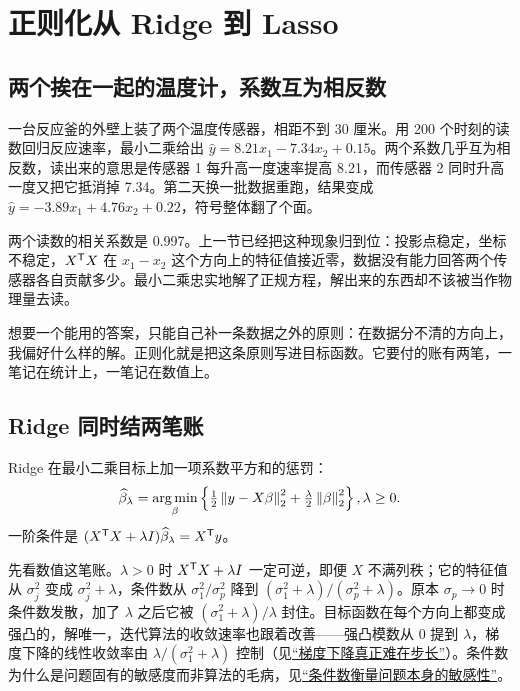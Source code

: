 \section{正则化从 Ridge 到 Lasso}
\label{sec:13-Machine-Learning/02-Linear-Models/02}

\subsection{两个挨在一起的温度计，系数互为相反数}

一台反应釜的外壁上装了两个温度传感器，相距不到 30 厘米。用 200 个时刻的读数回归反应速率，最小二乘给出 \(\widehat y=8.21x_1-7.34x_2+0.15\)。两个系数几乎互为相反数，读出来的意思是传感器 1 每升高一度速率提高 8.21，而传感器 2 同时升高一度又把它抵消掉 7.34。第二天换一批数据重跑，结果变成 \(\widehat y=-3.89x_1+4.76x_2+0.22\)，符号整体翻了个面。

两个读数的相关系数是 0.997。上一节已经把这种现象归到位：投影点稳定，坐标不稳定，\(X^{\mathsf{T}}X\) 在 \(x_1-x_2\) 这个方向上的特征值接近零，数据没有能力回答两个传感器各自贡献多少。最小二乘忠实地解了正规方程，解出来的东西却不该被当作物理量去读。

想要一个能用的答案，只能自己补一条数据之外的原则：在数据分不清的方向上，我偏好什么样的解。正则化就是把这条原则写进目标函数。它要付的账有两笔，一笔记在统计上，一笔记在数值上。

\subsection{Ridge 同时结两笔账}

Ridge 在最小二乘目标上加一项系数平方和的惩罚：
\[
\widehat\beta_\lambda=\operatorname*{arg\,min}_\beta\left\{\tfrac12\left\lVert y-X\beta\right\rVert_2^2+\tfrac{\lambda}{2}\left\lVert\beta\right\rVert_2^2\right\},
\space\lambda\ge 0 .
\]
一阶条件是 \((X^{\mathsf{T}}X+\lambda I)\widehat\beta_\lambda=X^{\mathsf{T}}y\)。

先看数值这笔账。\(\lambda>0\) 时 \(X^{\mathsf{T}}X+\lambda I\) 一定可逆，即便 \(X\) 不满列秩；它的特征值从 \(\sigma_j^2\) 变成 \(\sigma_j^2+\lambda\)，条件数从 \(\sigma_1^2/\sigma_p^2\) 降到 \((\sigma_1^2+\lambda)/(\sigma_p^2+\lambda)\)。原本 \(\sigma_p\to 0\) 时条件数发散，加了 \(\lambda\) 之后它被 \((\sigma_1^2+\lambda)/\lambda\) 封住。目标函数在每个方向上都变成强凸的，解唯一，迭代算法的收敛速率也跟着改善——强凸模数从 0 提到 \(\lambda\)，梯度下降的线性收敛率由 \(\lambda/(\sigma_1^2+\lambda)\) 控制（见\hyperref[sec:09-Convex-Optimization/06-Optimization-Algorithms/01]{``梯度下降真正难在步长''}）。条件数为什么是问题固有的敏感度而非算法的毛病，见\hyperref[sec:08-Numerical-Analysis/01-Floating-Point-and-Error/03]{``条件数衡量问题本身的敏感性''}。

